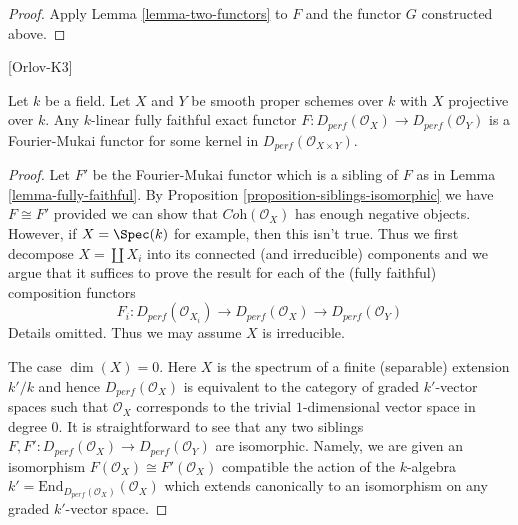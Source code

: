 \begin{proof}
Apply Lemma \ref{lemma-two-functors} to $F$ and the functor
$G$ constructed above.
\end{proof}

\begin{theorem}[Orlov]
\label{theorem-fully-faithful}
\begin{reference}
\cite{Theorem 2.2}[Orlov-K3]
\end{reference}
Let $k$ be a field. Let $X$ and $Y$ be smooth proper schemes over $k$
with $X$ projective over $k$. Any $k$-linear fully faithful exact 
functor $F : D_{perf}(\mathcal{O}_X) \to D_{perf}(\mathcal{O}_Y)$
is a Fourier-Mukai functor for some kernel in
$D_{perf}(\mathcal{O}_{X \times Y})$.
\end{theorem}

\begin{proof}
Let $F'$ be the Fourier-Mukai functor which is a sibling of $F$
as in Lemma \ref{lemma-fully-faithful}.
By Proposition \ref{proposition-siblings-isomorphic} we have $F \cong F'$
provided we can show that $\textit{Coh}(\mathcal{O}_X)$ has enough
negative objects. However, if $X = \Spec(k)$ for example, then
this isn't true. Thus we first decompose $X = \coprod X_i$
into its connected (and irreducible) components and we
argue that it suffices to prove the result for each of the
(fully faithful) composition functors
$$
F_i :
D_{perf}(\mathcal{O}_{X_i}) \to
D_{perf}(\mathcal{O}_X) \to
D_{perf}(\mathcal{O}_Y)
$$
Details omitted. Thus we may assume $X$ is irreducible.

\medskip\noindent
The case $\dim(X) = 0$. Here $X$ is the spectrum of a finite (separable)
extension $k'/k$ and hence $D_{perf}(\mathcal{O}_X)$
is equivalent to the category
of graded $k'$-vector spaces such that $\mathcal{O}_X$ corresponds to the
trivial $1$-dimensional vector space in degree $0$.
It is straightforward to see that any two
siblings $F, F' : D_{perf}(\mathcal{O}_X) \to D_{perf}(\mathcal{O}_Y)$
are isomorphic. Namely, we are given an isomorphism
$F(\mathcal{O}_X) \cong F'(\mathcal{O}_X)$
compatible the action of the $k$-algebra
$k' = \text{End}_{D_{perf}(\mathcal{O}_X)}(\mathcal{O}_X)$
which extends canonically to an isomorphism on any graded $k'$-vector space.


\end{proof}
